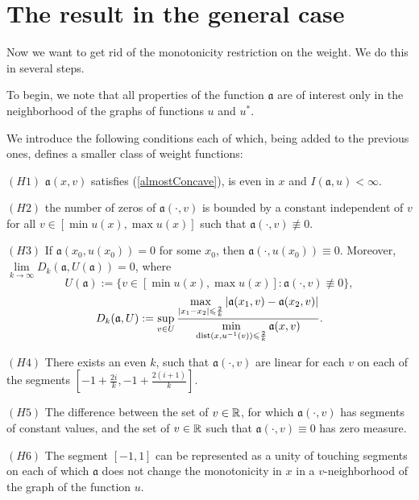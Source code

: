 \section{The result in the general case}

Now we want to get rid of the monotonicity restriction on the weight.
We do this in several steps.

To begin, we note that all properties of the function $\mathfrak a$ are of interest
only in the neighborhood of the graphs of functions $u$ and $u^*$.

We introduce the following conditions each of which, being added to the previous ones, defines a smaller class of weight functions:

\bigskip

\smallskip
\noindent
$(H1)$ $\mathfrak a(x, v)$ satisfies (\ref{almostConcave}), is even in $x$ and $I(\mathfrak a, u) < \infty$.
\smallskip

\bigskip
\noindent
$(H2)$ the number of zeros of $\mathfrak a(\cdot, v)$ is bounded by a constant independent of $v$
for all $v \in [\min u(x), \max u(x)]$ such that $\mathfrak a(\cdot, v) \not \equiv 0$.

\bigskip
\noindent
$(H3)$ If $\mathfrak a(x_0, u(x_0)) = 0$ for some $x_0$, then $\mathfrak a(\cdot, u(x_0)) \equiv 0$.
Moreover, $\lim\limits_{k \to \infty} D_k(\mathfrak a, U(\mathfrak a)) = 0$, where
$$U(\mathfrak a) := \{ v \in [\min u(x), \max u(x)]: \mathfrak a(\cdot, v) \not \equiv 0 \},$$
\begin{equation}
\label{bigD}
D_k(\mathfrak a, U): = \sup \limits_{v \in U}
\frac{\max \limits_{\abs{x_1 - x_2} \le \frac{2}{k}} \abs{\mathfrak a(x_1, v) - \mathfrak a(x_2, v)}}
{\min \limits_{\dist (x, u^{-1} (v)) \le \frac{2}{k}} \mathfrak a(x, v)}.
\end{equation}

\bigskip
\noindent
$(H4)$ There exists an even $k$, such that $\mathfrak a(\cdot, v)$ are linear for each $v$ on each of the segments
$[-1 + \frac{2i}{k}, -1 + \frac{2(i + 1)}{k}]$.

\bigskip
\noindent
$(H5)$ The difference between the
set of $v \in \mathbb R$, for which $\mathfrak a(\cdot, v)$ has segments of constant values,
and the set of $v \in \mathbb R$ such that $\mathfrak a(\cdot, v) \equiv 0$
has zero measure.

\bigskip
\noindent
$(H6)$ The segment $[-1, 1]$ can be represented as a unity of touching segments
on each of which $\mathfrak a$ does not change the monotonicity in $x$ in a $v$-neighborhood of the graph of the function $u$.

